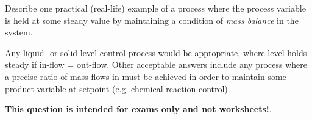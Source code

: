 

Describe one practical (real-life) example of a process where the process variable is held at some steady value by maintaining a condition of {\it mass balance} in the system.

\vskip 50pt







Any liquid- or solid-level control process would be appropriate, where level holds steady if in-flow = out-flow.  Other acceptable answers include any process where a precise ratio of mass flows in must be achieved in order to maintain some product variable at setpoint (e.g. chemical reaction control).







{\bf This question is intended for exams only and not worksheets!}.




